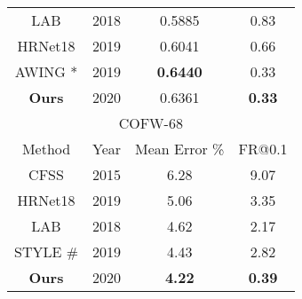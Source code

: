 \documentclass[runningheads]{llncs}
\begin{document}
\begin{table}[t!]
{{\begin{tabular}{cccc}
                    LAB \cite{wu2018look} & 2018 & 0.5885 & 0.83 \\
                    HRNet18 \cite{sun2019deep} & 2019 & 0.6041 & 0.66 \\
                    AWING \cite{wang2019adaptive} * & 2019 & \textbf{0.6440} & 0.33 \\
                        \textbf{Ours} & 2020 & 0.6361 & \textbf{0.33} \\
            \midrule
                \multicolumn{4}{c}{COFW-68} \\
            \cmidrule{1-4}
                Method & Year & Mean Error \% & FR@0.1 \\
            \cmidrule{1-4}
                CFSS \cite{zhu2015face} & 2015 & 6.28 & 9.07 \\
                HRNet18 \cite{sun2019deep} & 2019 & 5.06 & 3.35 \\
                LAB \cite{wu2018look} & 2018 & 4.62 & 2.17 \\
                STYLE \cite{qian2019aggregation} \# & 2019 & 4.43 & 2.82 \\
                    \textbf{Ours} & 2020 & \textbf{4.22} & \textbf{0.39} \\
            \bottomrule
          \end{tabular}
          \label{tab:crossvalid}
         }
     
}
\end{table}
\end{document}
